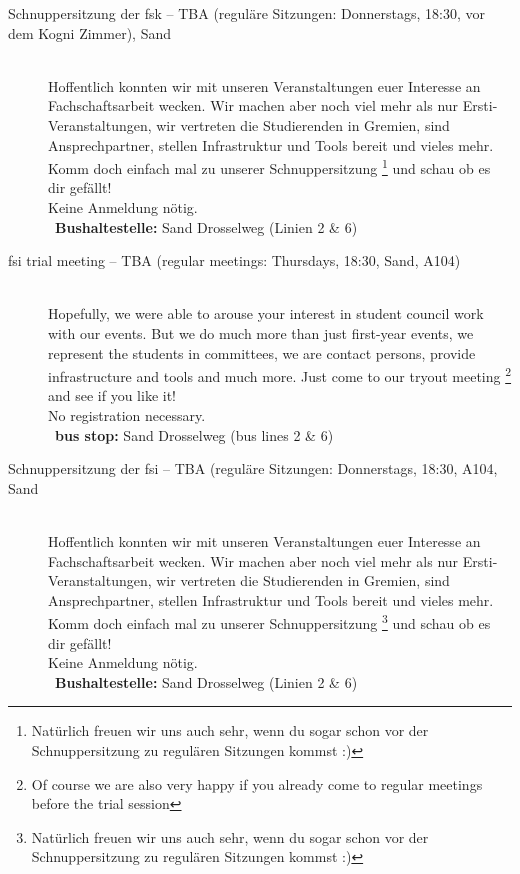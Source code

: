\begin{description}
\ifkogwiss
	\item[Schnuppersitzung der fsk -- TBA (reguläre Sitzungen: Donnerstags, 18:30, vor dem Kogni Zimmer), Sand]~\\%
	Hoffentlich konnten wir mit unseren Veranstaltungen euer Interesse an Fachschaftsarbeit wecken.
	Wir machen aber noch viel mehr als nur Ersti-Veranstaltungen, wir vertreten die Studierenden in Gremien,
	sind Ansprechpartner, stellen Infrastruktur und Tools bereit und vieles mehr.
	Komm doch einfach mal zu unserer Schnuppersitzung
	\footnote{Natürlich freuen wir uns auch sehr, wenn du sogar schon vor der Schnuppersitzung zu regulären Sitzungen kommst :)}
	und schau ob es dir gefällt!\\
	Keine Anmeldung nötig.\\
	~\textbf{Bushaltestelle:} Sand Drosselweg (Linien 2 \& 6)
\else
	\ifml
		\item[fsi trial meeting -- TBA (regular meetings: Thursdays, 18:30, Sand, A104)]~\\%
		Hopefully, we were able to arouse your interest in student council work with our events.
		But we do much more than just first-year events, we represent the students in committees,
		we are contact persons, provide infrastructure and tools and much more.
		Just come to our tryout meeting
		\footnote{Of course we are also very happy if you already come to regular meetings before the trial session}
		and see if you like it!\\
		No registration necessary.\\
		~\textbf{bus stop:} Sand Drosselweg (bus lines 2 \& 6)
	\else
		\item[Schnuppersitzung der fsi -- TBA (reguläre Sitzungen: Donnerstags, 18:30, A104, Sand]~\\%
		Hoffentlich konnten wir mit unseren Veranstaltungen euer Interesse an Fachschaftsarbeit wecken.
		Wir machen aber noch viel mehr als nur Ersti-Veranstaltungen, wir vertreten die Studierenden in Gremien,
		sind Ansprechpartner, stellen Infrastruktur und Tools bereit und vieles mehr.
		Komm doch einfach mal zu unserer Schnuppersitzung
		\footnote{Natürlich freuen wir uns auch sehr, wenn du sogar schon vor der Schnuppersitzung zu regulären Sitzungen kommst :)}
		und schau ob es dir gefällt!\\
		Keine Anmeldung nötig.\\
		~\textbf{Bushaltestelle:} Sand Drosselweg (Linien 2 \& 6)
	\fi
\fi


\end{description}
